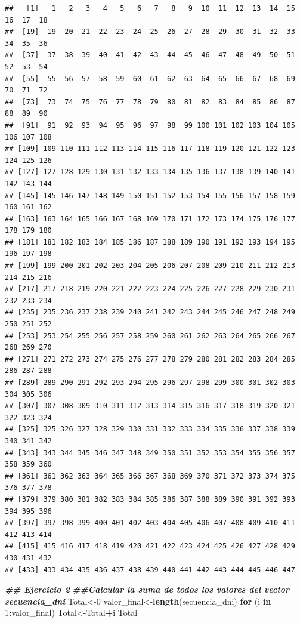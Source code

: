 \documentclass[runningheads]{llncs}
\newenvironment{Shaded}{\begin{snugshade}}{\end{snugshade}}
\newcommand{\ControlFlowTok}[1]{\textcolor[rgb]{0.13,0.29,0.53}{\textbf{#1}}}
\newcommand{\DecValTok}[1]{\textcolor[rgb]{0.00,0.00,0.81}{#1}}
\newcommand{\DocumentationTok}[1]{\textcolor[rgb]{0.56,0.35,0.01}{\textbf{\textit{#1}}}}
\newcommand{\FunctionTok}[1]{\textcolor[rgb]{0.13,0.29,0.53}{\textbf{#1}}}
\newcommand{\NormalTok}[1]{#1}
\newcommand{\OtherTok}[1]{\textcolor[rgb]{0.56,0.35,0.01}{#1}}
\newcommand{\SpecialCharTok}[1]{\textcolor[rgb]{0.81,0.36,0.00}{\textbf{#1}}}
\begin{document}
\begin{verbatim}
##   [1]   1   2   3   4   5   6   7   8   9  10  11  12  13  14  15  16  17  18
##  [19]  19  20  21  22  23  24  25  26  27  28  29  30  31  32  33  34  35  36
##  [37]  37  38  39  40  41  42  43  44  45  46  47  48  49  50  51  52  53  54
##  [55]  55  56  57  58  59  60  61  62  63  64  65  66  67  68  69  70  71  72
##  [73]  73  74  75  76  77  78  79  80  81  82  83  84  85  86  87  88  89  90
##  [91]  91  92  93  94  95  96  97  98  99 100 101 102 103 104 105 106 107 108
## [109] 109 110 111 112 113 114 115 116 117 118 119 120 121 122 123 124 125 126
## [127] 127 128 129 130 131 132 133 134 135 136 137 138 139 140 141 142 143 144
## [145] 145 146 147 148 149 150 151 152 153 154 155 156 157 158 159 160 161 162
## [163] 163 164 165 166 167 168 169 170 171 172 173 174 175 176 177 178 179 180
## [181] 181 182 183 184 185 186 187 188 189 190 191 192 193 194 195 196 197 198
## [199] 199 200 201 202 203 204 205 206 207 208 209 210 211 212 213 214 215 216
## [217] 217 218 219 220 221 222 223 224 225 226 227 228 229 230 231 232 233 234
## [235] 235 236 237 238 239 240 241 242 243 244 245 246 247 248 249 250 251 252
## [253] 253 254 255 256 257 258 259 260 261 262 263 264 265 266 267 268 269 270
## [271] 271 272 273 274 275 276 277 278 279 280 281 282 283 284 285 286 287 288
## [289] 289 290 291 292 293 294 295 296 297 298 299 300 301 302 303 304 305 306
## [307] 307 308 309 310 311 312 313 314 315 316 317 318 319 320 321 322 323 324
## [325] 325 326 327 328 329 330 331 332 333 334 335 336 337 338 339 340 341 342
## [343] 343 344 345 346 347 348 349 350 351 352 353 354 355 356 357 358 359 360
## [361] 361 362 363 364 365 366 367 368 369 370 371 372 373 374 375 376 377 378
## [379] 379 380 381 382 383 384 385 386 387 388 389 390 391 392 393 394 395 396
## [397] 397 398 399 400 401 402 403 404 405 406 407 408 409 410 411 412 413 414
## [415] 415 416 417 418 419 420 421 422 423 424 425 426 427 428 429 430 431 432
## [433] 433 434 435 436 437 438 439 440 441 442 443 444 445 446 447
\end{verbatim}

\begin{Shaded}
\begin{Highlighting}[]
\DocumentationTok{\#\# Ejercicio 2}
\DocumentationTok{\#\#Calcular la suma de todos los valores del vector secuencia\_dni}
\NormalTok{Total}\OtherTok{\textless{}{-}}\DecValTok{0}
\NormalTok{valor\_final}\OtherTok{\textless{}{-}}\FunctionTok{length}\NormalTok{(secuencia\_dni)}
\ControlFlowTok{for}\NormalTok{ (i }\ControlFlowTok{in} \DecValTok{1}\SpecialCharTok{:}\NormalTok{valor\_final)}
\NormalTok{Total}\OtherTok{\textless{}{-}}\NormalTok{Total}\SpecialCharTok{+}\NormalTok{i}
\NormalTok{Total}
\end{Highlighting}
\end{Shaded}
\end{document}
